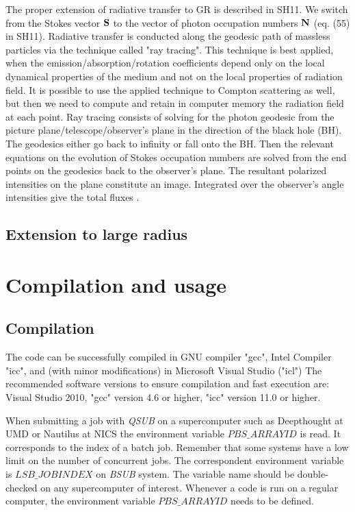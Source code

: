\documentclass{emulateapj}
\begin{document}
The proper extension of radiative transfer to GR is described in SH11. We switch from the Stokes vector ${\bf S}$ to the vector of photon occupation numbers ${\bf N}$ (eq. (55) in SH11).
Radiative transfer is conducted along the geodesic path of massless particles via the technique called "ray tracing". This technique is best applied,
when the emission/absorption/rotation coefficients depend only on the local dynamical properties of the medium and not on the local properties of radiation field.
It is possible to use the applied technique to Compton scattering as well, but then we need to compute and retain in computer memory the radiation field at each point.
Ray tracing consists of solving for the photon geodesic from the picture plane/telescope/observer's plane in the direction of the black hole (BH).
The geodesics either go back to infinity or fall onto the BH. Then the relevant equations on the evolution of Stokes occupation numbers are solved from the end points
on the geodesics back to the observer's plane. The resultant polarized intensities on the plane constitute an image. Integrated over the observer's angle intensities
give the total fluxes \citep{Rybicki1979}.

\subsection{Extension to large radius}

\section{Compilation and usage}
\subsection{Compilation}
The code can be successfully compiled in GNU compiler "gcc", Intel Compiler "icc", and (with minor modifications) in Microsoft Visual Studio ("icl")
The recommended software versions to ensure compilation and fast execution are: Visual Studio 2010, "gcc" version 4.6 or higher, "icc" version 11.0 or higher.

When submitting a job with \textit{QSUB} on a supercomputer such as Deepthought at UMD or Nautilus at NICS
the environment variable $PBS\_ARRAYID$ is read. It corresponds to the index of a batch job.
Remember that some systems have a low limit on the number of concurrent jobs.
The correspondent environment variable is $LSB\_JOBINDEX$ on \textit{BSUB} system. The variable name should be double-checked on any supercomputer of interest.
Whenever a code is run on a regular computer, the environment variable $PBS\_ARRAYID$ needs to be defined.
\end{document}
